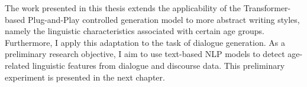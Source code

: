 The work presented in this thesis extends the applicability of the Transformer-based Plug-and-Play controlled generation model to more abstract writing styles, namely the linguistic characteristics associated with certain age groups. Furthermore, I apply this adaptation to the task of dialogue generation. As a preliminary research objective, I aim to use text-based NLP models to detect age-related linguistic features from dialogue and discourse data. This preliminary experiment is presented in the next chapter.

